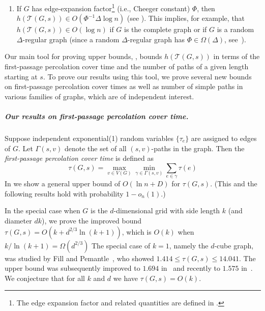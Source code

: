 \documentclass{patmorin}
\newcommand{\tcal}{\mathcal{T}}
\begin{document}
\begin{enumerate}
  \item If $G$ has edge-expansion factor\footnote{The
  edge expansion factor and related quantities are defined in
  .} (i.e., Cheeger constant) $\Phi$, then
  $h(\tcal(G,s))\in O(\Phi^{-1}\Delta\log n)$ (see ).  This implies, for example,
  that $h(\tcal(G,s))\in O(\log n)$ if $G$ is the complete graph or if $G$ is
  a random $\Delta$-regular graph (since a random $\Delta$-regular
  graph has $\Phi\in \Omega(\Delta)$, see~\cite{bollobas:isoperimetric}).
\end{enumerate}

Our main tool for proving upper bounds, , bounds $h(\tcal(G,s))$ in terms of the first-passage percolation cover time and the number of paths of  a given length starting at $s$.
To prove our results using this tool, we prove several new bounds
on first-passage percolation cover times  as well
as number of simple paths in various families of graphs,
which are of independent interest.

\subparagraph{Our results on first-passage percolation cover time.}
Suppose independent exponential(1) random variables $\{\tau_e\}$ are assigned to edges of $G$.
Let $\Gamma(s,v)$ denote the set of all $(s,v)$-paths in the graph.
Then the \emph{first-passage percolation cover time} is defined as 
\[
	\tau(G,s) = \max_{v\in V(G)} \min_{\gamma\in\Gamma(s,v)} \sum_{e\in\gamma} \tau(e)
\]
In  we show a general upper bound of 
$O(\ln n + D)$ for $\tau(G,s)$. (This and the following results hold with probability $1-o_n(1)$.)

In the special case when $G$ is the $d$-dimensional grid with side length $k$ (and diameter $dk$), we prove the improved bound 
$\tau(G,s)=O(k+d^{2/3}\ln(k+1))$,
which is $O(k)$ when $k/\ln(k+1)=\Omega(d^{2/3})$
The special case of $k=1$, namely the $d$-cube graph, was studied by Fill and Pemantle~\cite{fill.pemantle:percolation}, who showed $1.414\leq \tau(G,s)\leq 14.041$.
The upper bound was subsequently improved to
$1.694$
in~\cite{bollobas.kohayakawa:on} 
and recently to $1.575$ in~\cite{martinsson:unoriented}.
We conjecture that for all $k$ and $d$ we have
$\tau(G,s)=O(k)$.

\end{document}
